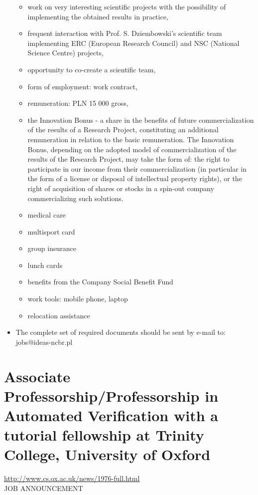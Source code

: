 \documentclass[prodmode,acmtecs]{acmsmall} %
\begin{document}
\begin{itemize}
\begin{itemize}\item  work on very interesting scientific projects with the possibility of implementing the obtained results in practice,
\item  frequent interaction with Prof. S. Dziembowski's scientific team implementing ERC (European Research Council) and NSC (National Science Centre) projects,
\item  opportunity to co-create a scientific team,
\item  form of employment: work contract,
\item  remuneration: PLN 15 000 gross,
\item  the Innovation Bonus - a share in the benefits of future commercialization of the results of a Research Project, constituting an additional remuneration in relation to the basic remuneration. The Innovation Bonus, depending on the adopted model of commercialization of the results of the Research Project, may take the form of: the right to participate in our income from their commercialization (in particular in the form of a license or disposal of intellectual property rights), or the right of acquisition of shares or stocks in a spin-out company commercializing such solutions.
\item  medical care
\item  multisport card
\item  group insurance
\item  lunch cards
\item  benefits from the Company Social Benefit Fund
\item  work tools: mobile phone, laptop
\item  relocation assistance
\end{itemize} 
\item  The complete set of required documents should be sent by e-mail to: jobs@ideas-ncbr.pl 
 
\end{itemize}\section{Associate Professorship/Professorship in Automated Verification with a tutorial fellowship at Trinity College, University of Oxford}\label{AssociateProfessorshipProfessorshipinAutomatedVerificationwithatutorialfellowshipatTrinityCollegeUniversityofOxford}  \href{http://www.cs.ox.ac.uk/news/1976-full.html}{http://www.cs.ox.ac.uk/news/1976-full.html}\\ 
JOB ANNOUNCEMENT 
\end{document}
